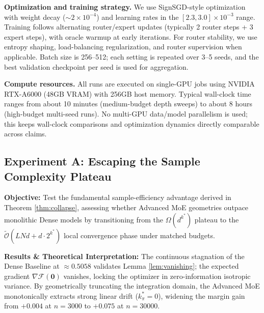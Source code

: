 \documentclass{article}
\newcommand{\1}{\mathbb{I}}
\newcommand{\calO}{\mathcal{O}}
\newcommand{\calF}{\mathcal{F}}
\begin{document}
\textbf{Optimization and training strategy.} We use SignSGD-style optimization with weight decay ($\sim 2\times10^{-4}$) and learning rates in the $[2.3, 3.0]\times 10^{-3}$ range. Training follows alternating router/expert updates (typically 2 router steps + 3 expert steps), with oracle warmup at early iterations. For router stability, we use entropy shaping, load-balancing regularization, and router supervision when applicable. Batch size is 256--512; each setting is repeated over 3--5 seeds, and the best validation checkpoint per seed is used for aggregation.

\textbf{Compute resources.} All runs are executed on single-GPU jobs using NVIDIA RTX-A6000 (48GB VRAM) with 256GB host memory. Typical wall-clock time ranges from about 10 minutes (medium-budget depth sweeps) to about 8 hours (high-budget multi-seed runs). No multi-GPU data/model parallelism is used; this keeps wall-clock comparisons and optimization dynamics directly comparable across claims.


\subsection{Experiment A: Escaping the Sample Complexity Plateau}
\label{app:expa}
\textbf{Objective:} Test the fundamental sample-efficiency advantage derived in Theorem \ref{thm:collapse}, assessing whether Advanced MoE geometries outpace monolithic Dense models by transitioning from the $\Omega(d^{k^*})$ plateau to the $\tilde{\calO}(LNd + d \cdot 2^{k^*})$ local convergence phase under matched budgets.

\textbf{Results \& Theoretical Interpretation:} The continuous stagnation of the Dense Baseline at $\approx 0.5058$ validates Lemma \ref{lem:vanishing}; the expected gradient $\nabla \calF(\mathbf{0})$ vanishes, locking the optimizer in zero-information isotropic variance. By geometrically truncating the integration domain, the Advanced MoE monotonically extracts strong linear drift ($k_\pi^* = 0$), widening the margin gain from $+0.004$ at $n=3000$ to $+0.075$ at $n=30000$.
\end{document}
